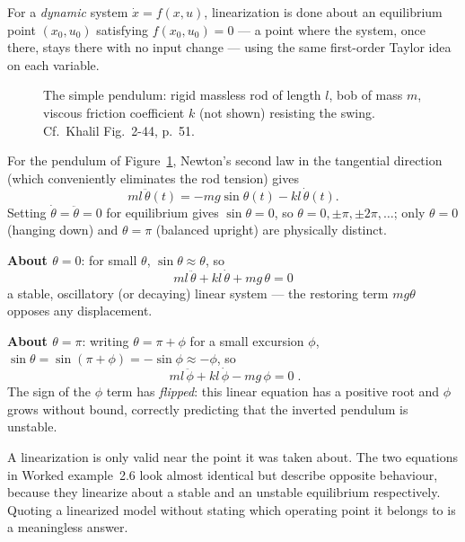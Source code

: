 \documentclass[11pt,a4paper]{article}
\begin{document}
For a \emph{dynamic} system $\dot x=f(x,u)$, linearization is done about an
equilibrium point $(x_0,u_0)$ satisfying $f(x_0,u_0)=0$ --- a point where the
system, once there, stays there with no input change --- using the same
first-order Taylor idea on each variable.

\begin{figure}[htbp]
\centering
{}
\caption{The simple pendulum: rigid massless rod of length $l$, bob of mass
$m$, viscous friction coefficient $k$ (not shown) resisting the swing. Cf.\
Khalil Fig.~2-44, p.~51.}
\label{fig:pendulum}
\end{figure}

\begin{workedex}[title=Worked example 2.6 --- linearizing the pendulum]
For the pendulum of Figure~\ref{fig:pendulum}, Newton's second law in the
tangential direction (which conveniently eliminates the rod tension) gives
\[
  ml\,\ddot\theta(t) = -mg\sin\theta(t) - kl\,\dot\theta(t) .
\]
Setting $\dot\theta=\ddot\theta=0$ for equilibrium gives $\sin\theta=0$, so
$\theta=0,\pm\pi,\pm2\pi,\ldots$; only $\theta=0$ (hanging down) and
$\theta=\pi$ (balanced upright) are physically distinct.

\smallskip
\textbf{About $\theta=0$}: for small $\theta$, $\sin\theta\approx\theta$, so
\[
  \boxed{\;ml\,\ddot\theta+kl\,\dot\theta+mg\,\theta=0\;}
\]
a stable, oscillatory (or decaying) linear system --- the restoring term
$mg\theta$ opposes any displacement.

\smallskip
\textbf{About $\theta=\pi$}: writing $\theta=\pi+\phi$ for a small excursion
$\phi$, $\sin\theta=\sin(\pi+\phi)=-\sin\phi\approx-\phi$, so
\[
  \boxed{\;ml\,\ddot\phi+kl\,\dot\phi-mg\,\phi=0\;} .
\]
The sign of the $\phi$ term has \emph{flipped}: this linear equation has a
positive root and $\phi$ grows without bound, correctly predicting that the
inverted pendulum is unstable.
\end{workedex}

\begin{pitfall}
A linearization is only valid near the point it was taken about. The two
equations in Worked example~2.6 look almost identical but describe opposite
behaviour, because they linearize about a stable and an unstable equilibrium
respectively. Quoting a linearized model without stating which operating point
it belongs to is a meaningless answer.
\end{pitfall}
\end{document}
